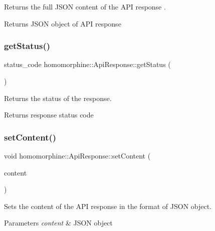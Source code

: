Returns the full J\+S\+ON content of the A\+PI response .

\begin{DoxyReturn}{Returns}
J\+S\+ON object of A\+PI response 
\end{DoxyReturn}
\mbox{\label{classhomomorphine_1_1_api_response_abe5d8dbece3cffee08905bb9389a8fd0}} 
\subsubsection{\texorpdfstring{getStatus()}{getStatus()}}
{\footnotesize\ttfamily status\+\_\+code homomorphine\+::\+Api\+Response\+::get\+Status (\begin{DoxyParamCaption}{ }\end{DoxyParamCaption})}

Returns the status of the response.

\begin{DoxyReturn}{Returns}
response status code 
\end{DoxyReturn}
\mbox{\label{classhomomorphine_1_1_api_response_aee304405cacc0b976145d2a3465ea7e5}} 
\subsubsection{\texorpdfstring{setContent()}{setContent()}}
{\footnotesize\ttfamily void homomorphine\+::\+Api\+Response\+::set\+Content (\begin{DoxyParamCaption}\item[{json\+::value \&}]{content }\end{DoxyParamCaption})}

Sets the content of the A\+PI response in the format of J\+S\+ON object.


\begin{DoxyParams}{Parameters}
{\em content} & J\+S\+ON object \\
\hline
\end{DoxyParams}
\mbox{\label{classhomomorphine_1_1_api_response_a3823ad464f6011397be80c62e391171c}} 
